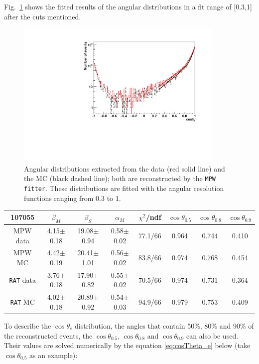 Fig.~\ref{angularResolMPW} shows the fitted results of the angular distributions in a fit range of [0.3,1] after the cuts mentioned. 
\begin{figure}
	\centering
	\includegraphics[width=10cm]{16NangularResol.pdf}
	\caption{Angular distributions extracted from the data (red solid line) and the MC (black dashed line); both are reconstructed by the \texttt{MPW fitter}. These distributions are fitted with the angular resolution functions ranging from 0.3 to 1.}
	\label{angularResolMPW}
\end{figure}

\begin{table}[ht]
	\begin{tabular}{cccccccc}%
		\toprule
	107055& $\beta_M$ &  $\beta_S$ & $\alpha_M$ & $\chi^2$/ndf & $\cos\theta_{0.5}$ & $\cos\theta_{0.8}$& $\cos\theta_{0.9}$\\
	\hline
	MPW data & 4.15$\pm$0.18 & 19.08$\pm$0.94 & 0.58$\pm$0.02 & 77.1/66 & 0.964 & 0.744 & 0.410 \\
	MPW MC & 4.42$\pm$0.19 & 20.41$\pm$1.01 & 0.56$\pm$0.02 & 83.8/66 & 0.974 & 0.768 & 0.454	 \\	
\hline
	\texttt{RAT} data & 3.76$\pm$0.18 & 17.90$\pm$0.82 & 0.55$\pm$0.02 & 70.5/66 & 0.974 & 0.731 & 0.364 \\
	\texttt{RAT} MC & 4.02$\pm$0.18 & 20.89$\pm$0.92 & 0.54$\pm$0.03 & 94.9/66 & 0.979 & 0.753 & 0.409	\\
		\bottomrule
	\end{tabular}
	\label{angularResolValuesUpdated}
\end{table}

To describe the $\cos\theta_e$ distribution, the angles that contain 50\%, 80\%
and 90\% of the reconstructed events, the $\cos\theta_{0.5}$, $\cos\theta_{0.8}$ and $\cos\theta_{0.9}$ can also be used. Their values are solved numerically by the equation \ref{eq:cosTheta_e} below (take $\cos\theta_{0.5}$ as an example):

